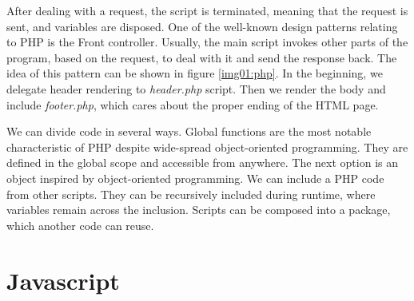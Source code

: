 After dealing with a request, the script is terminated, meaning that the request is sent, and variables are disposed.
One of the well-known design patterns relating to PHP is the Front controller.
Usually, the main script invokes other parts of the program, based on the request, to deal with it and send the response back.
The idea of this pattern can be shown in figure \ref{img01:php}.
In the beginning, we delegate header rendering to \textit{header.php} script.
Then we render the body and include \textit{footer.php}, which cares about the proper ending of the HTML page.
\par
We can divide code in several ways.
Global functions are the most notable characteristic of PHP despite wide-spread object-oriented programming.
They are defined in the global scope and accessible from anywhere.
The next option is an object inspired by object-oriented programming.
We can include a PHP code from other scripts.
They can be recursively included during runtime, where variables remain across the inclusion.
Scripts can be composed into a package, which another code can reuse.

\section{Javascript}

